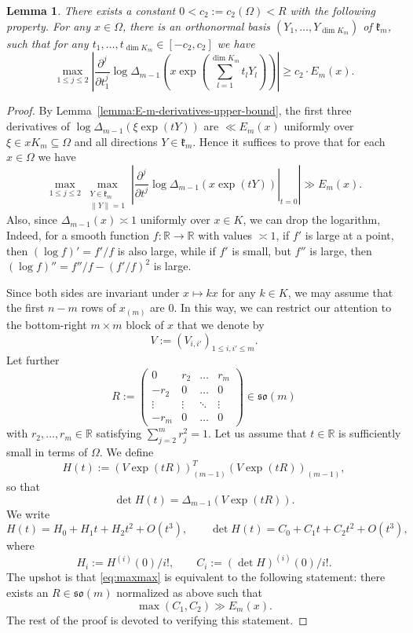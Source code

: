 \documentclass[11pt,oneside]{amsart}
\numberwithin{equation}{section}
\theoremstyle{remark}
\theoremstyle{plain}
\newtheorem{lemma}{Lemma}
\newcommand\RR{\mathbb{R}}
\newcommand\mfk{\mathfrak{k}}
\renewcommand\leq{\leqslant}
\renewcommand\geq{\geqslant}
\begin{document}
\begin{lemma}\label{lemma:Delta-derivatives} There exists a constant $0<c_2:=c_2(\Omega)<R$
with the following property. For any $x\in\Omega$, there is an orthonormal basis $(Y_1,\dotsc,Y_{\dim K_{m}})$ of $\mfk_{m}$, such that for any $t_1,\dotsc,t_{\dim K_{m}}\in [-c_2,c_2]$ we have
\[
\max_{1\leq j\leq 2} \left| \frac{\partial^j}{\partial t_1^j} \log \Delta_{m-1}\left(x \exp\left(\sum_{l=1}^{\dim K_{m}} t_l Y_l\right) \right) \right| \geq c_2 \cdot E_{m}(x).
\]
\end{lemma}
\begin{proof}
By Lemma~\ref{lemma:E-m-derivatives-upper-bound}, the first three derivatives of $\log \Delta_{m-1}(\xi\exp(tY))$ are $\ll E_{m}(x)$ uniformly over $\xi\in xK_{m} \subseteq \Omega$ and all directions $Y\in\mfk_{m}$. Hence it suffices to prove that
for each $x \in \Omega$ we have
\begin{equation}\label{eq:maxmax}
\max_{1 \leq j \leq 2} \max_{\substack{Y\in\mfk_{m}\\ \|Y\|=1}} \left| \left.\frac{\partial^j}{\partial t^j} \log \Delta_{m-1}(x \exp(tY))\right|_{t=0} \right| \gg E_{m}(x).
\end{equation}
Also, since $\Delta_{m-1}(x)\asymp 1$ uniformly over $x\in K$, we can drop the logarithm, Indeed, for a smooth function $f:\RR\to\RR$ with values $\asymp 1$, if $f'$ is large at a point, then $(\log f)'=f'/f$ is also large, while if $f'$ is small, but $f''$ is large, then $(\log f)''=f''/f-(f'/f)^2$ is large. 

Since both sides are invariant under $x\mapsto kx$ for any $k\in K$, 
we may assume that the first $n-m$ rows of $x_{(m)}$ are $0$. 
In this way, we can restrict our attention to the bottom-right $m\times m$ block of $x$ that we denote by
\[
V:=(V_{i,i'})_{1\leq i,i'\leq m}.
\]
Let further
\[
R:= \begin{pmatrix}
0 & r_2 & \dots & r_m \\
-r_2 & 0 & \dots & 0 \\
\vdots & \vdots & \ddots & \vdots \\
-r_m & 0 & \dots & 0
\end{pmatrix} \in \mathfrak{so}(m)
\]
with $r_2,\dotsc,r_m\in\RR$ satisfying $\sum_{j=2}^m r_j^2=1$. Let us assume that $t\in\RR$ is sufficiently small in terms of $\Omega$. We define
\[
H(t):=(V \exp(tR))_{(m-1)}^T (V \exp(tR))_{(m-1)},
\]
so that $$\det H(t)=\Delta_{m-1}(V\exp (tR)).$$
We write
\[
H(t)=H_0 + H_1 t + H_2 t^2 + O(t^3),\qquad \det H(t)= C_0 + C_1 t + C_2 t^2 + O(t^3),
\]
where
\[H_i:= H^{(i)}(0)/i!,\qquad C_i:= (\det H)^{(i)}(0)/i!.\]
The upshot is that \eqref{eq:maxmax} is equivalent to the following statement: there exists an $R\in\mathfrak{so}(m)$ normalized as above such that
\begin{equation}\label{eq:maxC1C2}
\max(C_1,C_2) \gg E_{m}(x).
\end{equation}
The rest of the proof is devoted to verifying this statement.


\end{proof}
\end{document}
